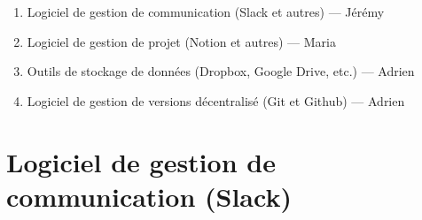 \documentclass[
  letterpaper,
]{scrbook}
\providecommand{\tightlist}{%
  \setlength{\itemsep}{0pt}\setlength{\parskip}{0pt}}\usepackage{longtable,booktabs,array}
\begin{document}
\begin{enumerate}
\def\labelenumi{\arabic{enumi}.}
\tightlist
\item
  Logiciel de gestion de communication (Slack et autres) --- Jérémy
\item
  Logiciel de gestion de projet (Notion et autres) --- Maria
\item
  Outils de stockage de données (Dropbox, Google Drive, etc.) --- Adrien
\item
  Logiciel de gestion de versions décentralisé (Git et Github) ---
  Adrien
\end{enumerate}

\hypertarget{logiciel-de-gestion-de-communication-slack}{%
\section{Logiciel de gestion de communication
(Slack)}\label{logiciel-de-gestion-de-communication-slack}}
\end{document}
